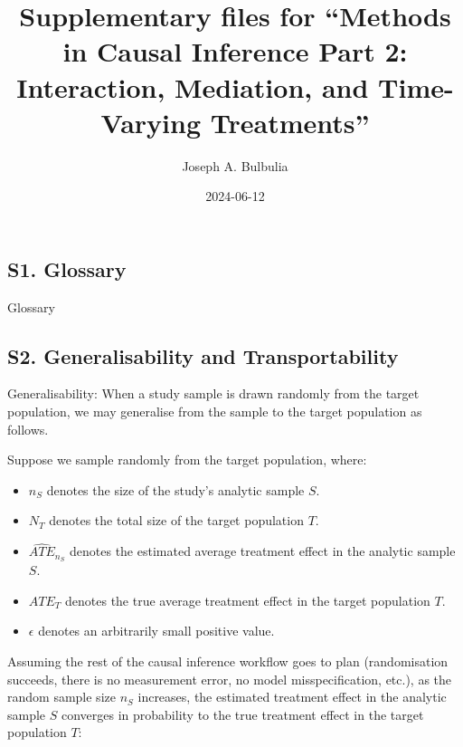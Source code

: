 \documentclass[
  single column]{article}
\title{Supplementary files for ``Methods in Causal Inference Part 2:
Interaction, Mediation, and Time-Varying Treatments''}
\author{Joseph A. Bulbulia}
\affil{%
             \small{     Victoria University of Wellington, New Zealand
          ORCID \textcolor[HTML]{A6CE39}{\aiOrcid} ~0000-0002-5861-2056 }
              }
\date{2024-06-12}
\providecommand{\tightlist}{%
  \setlength{\itemsep}{0pt}\setlength{\parskip}{0pt}}\usepackage{longtable,booktabs,array}
\renewcommand*\contentsname{Table of contents}
\newcommand\contentsname{Table of contents}
\begin{document}
\maketitle

\renewcommand*\contentsname{Table of contents}
{
\hypersetup{linkcolor=}
\setcounter{tocdepth}{2}
\tableofcontents
}
\listoftables
\newpage{}

\subsection{S1. Glossary}\label{id-app-a}

\begin{table}

\caption{\label{tbl-experiments}Glossary}

\centering{

\glossaryTerms

}

\end{table}%

\newpage{}

\subsection{S2. Generalisability and Transportability}\label{id-app-b}

Generalisability: When a study sample is drawn randomly from the target
population, we may generalise from the sample to the target population
as follows.

Suppose we sample randomly from the target population, where:

\begin{itemize}
\tightlist
\item
  \(n_S\) denotes the size of the study's analytic sample \(S\).
\item
  \(N_T\) denotes the total size of the target population \(T\).
\item
  \(\widehat{ATE}_{n_S}\) denotes the estimated average treatment effect
  in the analytic sample \(S\).
\item
  \(ATE_{T}\) denotes the true average treatment effect in the target
  population \(T\).
\item
  \(\epsilon\) denotes an arbitrarily small positive value.
\end{itemize}

Assuming the rest of the causal inference workflow goes to plan
(randomisation succeeds, there is no measurement error, no model
misspecification, etc.), as the random sample size \(n_S\) increases,
the estimated treatment effect in the analytic sample \(S\) converges in
probability to the true treatment effect in the target population \(T\):
\end{document}
